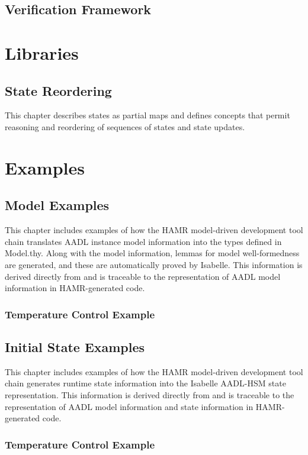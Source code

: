 \documentclass[10pt,oneside]{book}
\begin{document}


\chapter{Verification Framework}



%
%

\part{Libraries}

\chapter{State Reordering}

This chapter describes states as partial maps and defines concepts that permit
reasoning and reordering of sequences of states and state updates.




\part{Examples}

\chapter{Model Examples}

This chapter includes examples of how the HAMR model-driven
development tool chain translates AADL instance model information into
the types defined in Model.thy.   Along with the model information,
lemmas for model well-formedness are generated, and these are
automatically proved by Isabelle.   This information is derived
directly from and is traceable to the representation of AADL model
information in HAMR-generated code.

\section{Temperature Control Example}






\chapter{Initial State Examples}

This chapter includes examples of how the HAMR model-driven
development tool chain generates runtime state information into the
Isabelle AADL-HSM state representation.  This information is derived
directly from and is traceable to the representation of AADL model
information and state information in HAMR-generated code.

\section{Temperature Control Example}


\end{document}
